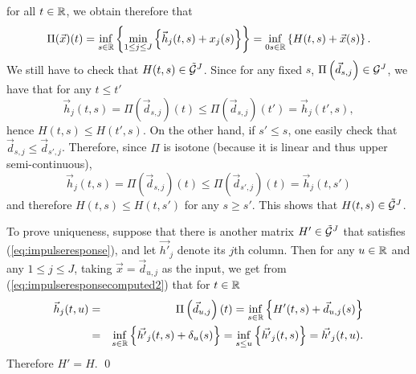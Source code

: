 for all $t \in \mathbb{R}$, we obtain therefore that
$$\Pi(\vec{x})(t)  =  \inf_{s \in \mathbb{R}} \left\{ \min_{1 \leq j \leq J} \left\{ \vec{h}_j(t,s) + x_j(s) \right\} \right\}
         =  \inf_{0s \in \mathbb{R}} \left\{ H(t,s) + \vec{x}(s) \right\}. $$
We still have to check that $H(t,s) \in \tilde{\mathcal G}^J$.
Since for any fixed $s$, $\Pi \left( \vec{d}_{s,j}  \right) \in \mathcal G^J$, we have that for any $t \leq t'$
$$ \vec{h}_{j}(t,s) = \Pi \left( \vec{d}_{s,j}  \right)(t) \leq \Pi \left( \vec{d}_{s,j}  \right)(t') =  \vec{h}_{j}(t',s), $$
 hence $H(t,s) \leq H(t',s)$.
On the other hand, if $s' \leq s$, one easily check that $\vec{d}_{s,j} \leq \vec{d}_{s',j}$. Therefore, since $\Pi$ is isotone (because it is linear and thus
upper semi-continuous),
$$ \vec{h}_{j}(t,s)  = \Pi \left( \vec{d}_{s,j}  \right)(t)  \leq \Pi \left( \vec{d}_{s',j}  \right)(t)   =  \vec{h}_{j}(t,s') $$
and therefore  $H(t,s) \leq H(t,s')$ for any $s \geq s'$. This shows that $H(t,s) \in \tilde{\mathcal G}^J$.

To prove uniqueness, suppose that there is another matrix $H' \in
\tilde{\mathcal G}^J$ that satisfies (\ref{eq:impulseresponse}), and
let $\vec{h'}_j$ denote its $j$th column. Then for any $u \in
\mathbb{R}$ and any $1 \leq j \leq J$, taking $ \vec{x} =
\vec{d}_{u,j} $ as the input, we get from
(\ref{eq:impulseresponsecomputed2}) that for $t \in \mathbb{R}$
\begin{eqnarray*}
\vec{h}_{j}(t,u) & = & \Pi \left( \vec{d}_{u,j}  \right)(t) =  \inf_{s \in \mathbb{R}}  \left\{ H'(t,s) + \vec{d}_{u,j}(s) \right\} \\
    & = &   \inf_{s \in \mathbb{R}}  \left\{ \vec{h'}_j(t,s) + \delta_u(s) \right\}  =  \inf_{s \leq u}  \left\{ \vec{h'}_j(t,s) \right\} =  \vec{h'}_j(t,u).
\end{eqnarray*}
Therefore $H'=H$.
\qed

